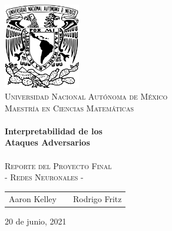 \begin{titlepage}
    \begin{center}
    \includegraphics[width=0.25\textwidth]{resources/unam_escudo.png}~\\[2cm]
    \textsc{\huge Universidad Nacional Autónoma de México}\\[0.5cm]  
    \textsc{\LARGE Maestría en Ciencias Matemáticas}\\[2cm]
    
    \HRule \\
    {\Huge \bfseries Interpretabilidad de los \\[1cm] Ataques Adversarios} \\[0.3cm] 
    \HRule \\[0.5cm]
    
    \textsc{\LARGE Reporte del Proyecto Final}\\[0.4cm]
    \textsc{\LARGE - Redes Neuronales - }\\[3cm]
    

    {\Large
    \begin{tabular}{ccc}
        Aaron Kelley & \hspace{1.5in} & Rodrigo Fritz
    \end{tabular}
    }
    \vfill

    {\Large 20 de junio, 2021}
    
    \end{center} 
\end{titlepage}